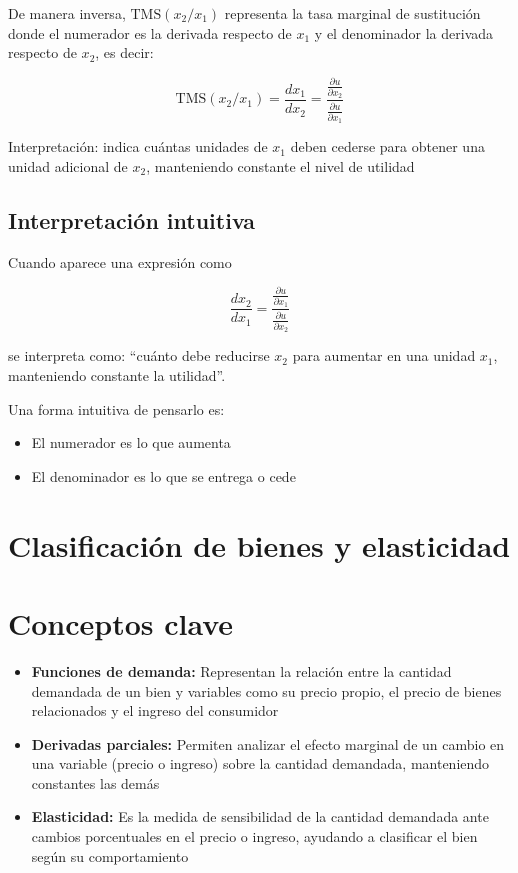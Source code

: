 \documentclass{article}
\begin{document}
\medskip

De manera inversa, {\color{teal}\( \text{TMS}(x_2/x_1) \)} representa la tasa marginal de sustitución donde el numerador es la derivada respecto de \( x_1 \) y el denominador la derivada respecto de \( x_2 \), es decir:

\[
\text{TMS}(x_2/x_1) = \frac{dx_1}{dx_2} = \frac{\frac{\partial u}{\partial x_2}}{\frac{\partial u}{\partial x_1}}
\]

{\color{teal}Interpretación: indica cuántas unidades de \( x_1 \) deben cederse para obtener una unidad adicional de \( x_2 \), manteniendo constante el nivel de utilidad}


\subsection*{Interpretación intuitiva}

Cuando aparece una expresión como

\[
\frac{dx_2}{dx_1} = \frac{\frac{\partial u}{\partial x_1}}{\frac{\partial u}{\partial x_2}}
\]

se interpreta como: {\color{teal}“cuánto debe reducirse \( x_2 \) para aumentar en una unidad \( x_1 \), manteniendo constante la utilidad”}.

\medskip

Una forma intuitiva de pensarlo es:

\begin{itemize}
  \item {\color{teal}El numerador es lo que aumenta}
  \item {\color{teal}El denominador es lo que se entrega o cede}
\end{itemize}




\newpage
\section{Clasificación de bienes y elasticidad}


\section*{Conceptos clave}

\begin{itemize}
    \item \textbf{\color{teal}Funciones de demanda:} Representan la relación entre la cantidad demandada de un bien y variables como su precio propio, el precio de bienes relacionados y el ingreso del consumidor
    \item \textbf{\color{teal}Derivadas parciales:} Permiten analizar el efecto marginal de un cambio en una variable (precio o ingreso) sobre la cantidad demandada, manteniendo constantes las demás
    \item \textbf{\color{teal}Elasticidad:} Es la medida de sensibilidad de la cantidad demandada ante cambios porcentuales en el precio o ingreso, ayudando a clasificar el bien según su comportamiento
\end{itemize}
\end{document}
